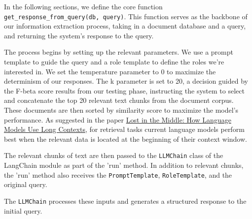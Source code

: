\documentclass{article}
\begin{document}
In the following sections, we define the core function \texttt{get\_response\_from\_query(db, query)}. This function serves as the backbone of our information extraction process, taking in a document database and a query, and returning the system's response to the query. 

The process begins by setting up the relevant parameters. We use a prompt template to guide the query and a role template to define the roles we're interested in. We set the temperature parameter to 0 to maximize the determinism of our responses. The k parameter is set to 20, a decision guided by the F-beta score results from our testing phase, instructing the system to select and concatenate the top 20 relevant text chunks from the document corpus. These documents are then sorted by similarity score to maximize the model's performance. As suggested in the paper \href{https://arxiv.org/abs/2307.03172}{Lost in the Middle: How Language Models Use Long Contexts}, for retrieval tasks current language models perform best when the relevant data is located at the beginning of their context window.

The relevant chunks of text are then passed to the \texttt{LLMChain} class of the LangChain module as part of the 'run' method. In addition to relevant chunks, the 'run' method also receives the \texttt{PromptTemplate}, \texttt{RoleTemplate}, and the original query.

The \texttt{LLMChain} processes these inputs and generates a structured response to the initial query.
\end{document}
